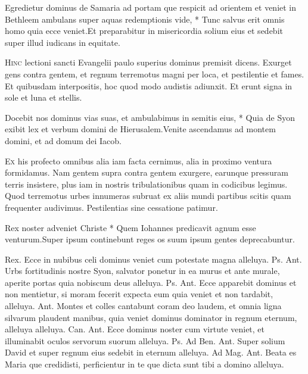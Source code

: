 \begin{multicols*}{2}
\begin{responsory}
{Egredietur dominus de Samaria ad portam que respicit ad orientem et veniet in Bethleem ambulans super aquas redemptionis vide, * Tunc salvus erit omnis homo quia ecce veniet.}{Et preparabitur in misericordia solium eius et sedebit super illud iudicans in equitate.}
\end{responsory}
\lettrine[lines=2]{\zallmancaps \color{Red} H}{inc} lectioni sancti Evangelii paulo superius dominus premisit dicens. Exurget gens contra gentem, et regnum terremotus magni per loca, et pestilentie et fames. Et quibusdam interpositis, hoc quod modo audistis adiunxit. Et erunt signa in sole et luna et stellis.
\begin{responsory}
{Docebit nos dominus vias suas, et ambulabimus in semitis eius, * Quia de Syon exibit lex et verbum domini de Hierusalem.}{Venite ascendamus ad montem domini, et ad domum dei Iacob.}
\end{responsory}
\lettrine[lines=2]{\zallmancaps \color{Blue} E}{x} his profecto omnibus alia iam facta cernimus, alia in proximo ventura formidamus. Nam gentem supra contra gentem exurgere, earunque pressuram terris insistere, plus iam in nostris tribulationibus quam in codicibus legimus. Quod terremotus urbes innumeras subruat ex aliis mundi partibus scitis quam frequenter audivimus. Pestilentias sine cessatione patimur.
\begin{responsory-doxology}
{Rex noster adveniet Christe * Quem Iohannes predicavit agnum esse venturum.}{Super ipsum continebunt reges os suum ipsum gentes deprecabuntur.}
\end{responsory-doxology}
Rex.
 Ecce in nubibus celi dominus veniet cum potestate magna alleluya. {\color{Red} Ps.}  {\color{Red} Ant.} Urbs fortitudinis nostre Syon, salvator ponetur in ea murus et ante murale, aperite portas quia nobiscum deus alleluya. {\color{Red} Ps.}  {\color{Red} Ant.} Ecce apparebit dominus et non mentietur, si moram fecerit expecta eum quia veniet et non tardabit, alleluya.  {\color{Red} Ant.} Montes et colles cantabunt coram deo laudem, et omnia ligna silvarum plaudent manibus, quia veniet dominus dominator in regnum eternum, alleluya alleluya. {\color{Red} Can.}  {\color{Red} Ant.} Ecce dominus noster cum virtute veniet, et illuminabit oculos servorum suorum alleluya. {\color{Red} Ps.}  {\color{Red} Ad Ben. Ant.} Super solium David et super regnum eius sedebit in eternum alleluya. {\color{Red} Ad Mag. Ant.} Beata es Maria que credidisti, perficientur in te que dicta sunt tibi a domino alleluya.

\end{multicols*}
